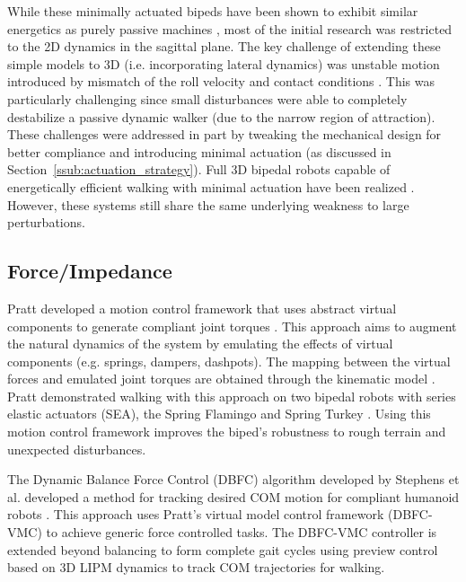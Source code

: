 While these minimally actuated bipeds have been shown to exhibit similar energetics as purely passive machines \cite{Asano:2004jp}, most of the initial research was restricted to the 2D dynamics in the sagittal plane. The key challenge of extending these simple models to 3D (i.e. incorporating lateral dynamics) was unstable motion introduced by mismatch of the roll velocity and contact conditions \cite{Kuo:1999tn}. This was particularly challenging since small disturbances were able to completely destabilize a passive dynamic walker (due to the narrow region of attraction). These challenges were addressed in part by tweaking the mechanical design for better compliance and introducing minimal actuation (as discussed in Section~\ref{ssub:actuation_strategy}). Full 3D bipedal robots capable of energetically efficient walking with minimal actuation have been realized \cite{Collins:2005vp,Anderson:2005cw,Hobbelen2008}. However, these systems still share the same underlying weakness to large perturbations. 


\subsection{Force/Impedance} %
\label{sub:related_force_impedance}
Pratt developed a motion control framework that uses abstract virtual components to generate compliant joint torques \cite{Pratt:1995ww}. This approach aims to augment the natural dynamics of the system by emulating the effects of virtual components (e.g. springs, dampers, dashpots). The mapping between the virtual forces and emulated joint torques are obtained through the kinematic model \cite{Pratt:1998cf}. Pratt demonstrated walking with this approach on two bipedal robots with series elastic actuators (SEA), the Spring Flamingo and Spring Turkey \cite{Pratt:2001vu}. Using this motion control framework improves the biped's robustness to rough terrain and unexpected disturbances.

The Dynamic Balance Force Control (DBFC) algorithm developed by Stephens et al. developed a method for tracking desired COM motion for compliant humanoid robots \cite{Stephens:2010fj}. This approach uses Pratt's virtual model control framework (DBFC-VMC) to achieve generic force controlled tasks. The DBFC-VMC controller is extended beyond balancing to form complete gait cycles using preview control \cite{KajitaEtAlICRA2003} based on 3D LIPM dynamics to track COM trajectories for walking. 

